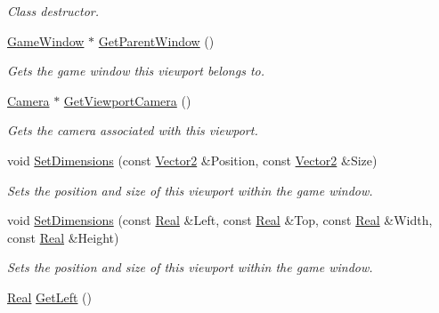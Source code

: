 \begin{DoxyCompactItemize}
\begin{DoxyCompactList}\small\item\em Class destructor. \item\end{DoxyCompactList}\item 
\hyperlink{classphys_1_1GameWindow}{GameWindow} $\ast$ \hyperlink{classphys_1_1Viewport_ac350d4c2e790edd488b212ccb6b20991}{GetParentWindow} ()
\begin{DoxyCompactList}\small\item\em Gets the game window this viewport belongs to. \item\end{DoxyCompactList}\item 
\hyperlink{classphys_1_1Camera}{Camera} $\ast$ \hyperlink{classphys_1_1Viewport_a755f7ede5f6552ef8b64d75f745b7957}{GetViewportCamera} ()
\begin{DoxyCompactList}\small\item\em Gets the camera associated with this viewport. \item\end{DoxyCompactList}\item 
void \hyperlink{classphys_1_1Viewport_a0d0c47add1187921fd40a8c8c363bc30}{SetDimensions} (const \hyperlink{classphys_1_1Vector2}{Vector2} \&Position, const \hyperlink{classphys_1_1Vector2}{Vector2} \&Size)
\begin{DoxyCompactList}\small\item\em Sets the position and size of this viewport within the game window. \item\end{DoxyCompactList}\item 
void \hyperlink{classphys_1_1Viewport_a49269f1ada31f280adc8d832c9536514}{SetDimensions} (const \hyperlink{namespacephys_af7eb897198d265b8e868f45240230d5f}{Real} \&Left, const \hyperlink{namespacephys_af7eb897198d265b8e868f45240230d5f}{Real} \&Top, const \hyperlink{namespacephys_af7eb897198d265b8e868f45240230d5f}{Real} \&Width, const \hyperlink{namespacephys_af7eb897198d265b8e868f45240230d5f}{Real} \&Height)
\begin{DoxyCompactList}\small\item\em Sets the position and size of this viewport within the game window. \item\end{DoxyCompactList}\item 
\hyperlink{namespacephys_af7eb897198d265b8e868f45240230d5f}{Real} \hyperlink{classphys_1_1Viewport_a9a5667cbbb1127a89e4702219fe44c7a}{GetLeft} ()

\end{DoxyCompactItemize}
